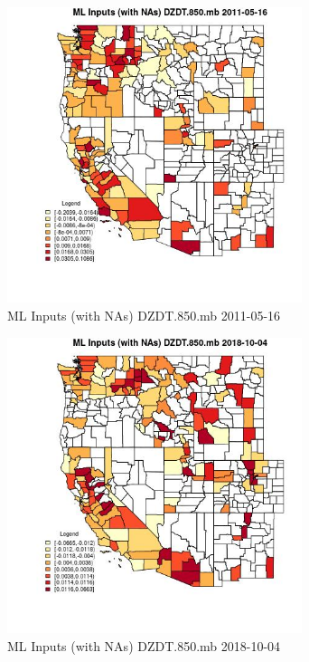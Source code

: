 \begin{figure} 
\centering  
\includegraphics[width=0.77\textwidth]{Code_Outputs/Report_ML_input_PM25_Step4_part_f_de_duplicated_aveswNAs_CountyDZDT850mbMean2011-05-16.jpg} 
\caption{\label{fig:Report_ML_input_PM25_Step4_part_f_de_duplicated_aveswNAsCountyDZDT850mbMean2011-05-16}ML Inputs (with NAs) DZDT.850.mb 2011-05-16} 
\end{figure} 
 

\begin{figure} 
\centering  
\includegraphics[width=0.77\textwidth]{Code_Outputs/Report_ML_input_PM25_Step4_part_f_de_duplicated_aveswNAs_CountyDZDT850mbMean2018-10-04.jpg} 
\caption{\label{fig:Report_ML_input_PM25_Step4_part_f_de_duplicated_aveswNAsCountyDZDT850mbMean2018-10-04}ML Inputs (with NAs) DZDT.850.mb 2018-10-04} 
\end{figure} 
 

